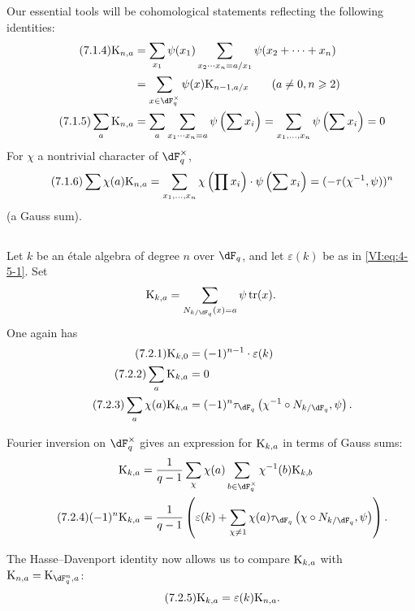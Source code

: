 \documentclass[12pt,oneside,english]{smfbook}
\DeclareMathOperator{\tr}{tr}
\newcounter{char}
\newcommand{\kloos}{\textnormal{K}} %
\begin{document}
Our essential tools will be cohomological statements reflecting the following identities:
\begin{align*}\tag{7.1.4}\label{VI:eq:7-1-4}
  \kloos_{n,a} &= \sum_{x_1} \psi(x_1) \sum_{x_2\dotsm x_n = a/x_1} \psi(x_2+\cdots + x_n) \\ \notag
    &= \sum_{x\in \dF_q^\times} \psi(x) \kloos_{n-1,a/x} \qquad (a\ne 0,n\geqslant 2) \\ \tag{7.1.5}\label{VI:eq:7-1-5}
  \sum_a \kloos_{n,a} &= \sum_a \sum_{x_1 \dotsm x_n = a} \psi\left(\sum x_i\right) = \sum_{x_1,\dots,x_n} \psi\left(\sum x_i\right) = 0
\end{align*}
For $\chi$ a nontrivial character of $\dF_q^\times$,
\begin{equation*}\tag{7.1.6}\label{VI:eq:7-1-6}
  \sum \chi(a) \kloos_{n,a} = \sum_{x_1,\dots,x_n} \chi\left(\prod x_i\right) \cdot \psi\left(\sum x_i\right) = (-\tau(\chi^{-1},\psi))^n
\end{equation*}
(a Gauss sum).

\subsection{}\label{VI:7-2}

Let $k$ be an étale algebra of degree $n$ over $\dF_q$, and let $\varepsilon(k)$ be as in \eqref{VI:eq:4-5-1}. Set
\[
  \kloos_{k,a} = \sum_{N_{k/\dF_q}(x)=a} \psi \tr(x) \text{.}
\]
One again has
\begin{align*}\tag{7.2.1}\label{VI:eq:7-2-1}
  \kloos_{k,0} &= (-1)^{n-1} \cdot \varepsilon(k) \\ \tag{7.2.2}\label{VI:eq:7-2-2}
  \sum_a \kloos_{k,a} &= 0 \\ \tag{7.2.3}\label{VI:eq:7-2-3}
  \sum_a \chi(a) \kloos_{k,a} &= (-1)^n \tau_{\dF_q}\left(\chi^{-1}\circ N_{k/\dF_q},\psi\right) \text{.}
\end{align*}

Fourier inversion on $\dF_q^\times$ gives an expression for $\kloos_{k,a}$ in terms of Gauss sums:
\begin{align*}
  \kloos_{k,a} &= \frac{1}{q-1} \sum_\chi \chi(a) \sum_{b\in \dF_q^\times} \chi^{-1}(b) \kloos_{k,b} \\ \tag{7.2.4}\label{VI:eq:7-2-4}
  (-1)^n \kloos_{k,a} &= \frac{1}{q-1} \left(\varepsilon(k) + \sum_{\chi\ne 1} \chi(a) \tau_{\dF_q}\left(\chi\circ N_{k/\dF_q},\psi\right) \right) \text{.}
\end{align*}

The Hasse--Davenport identity now allows us to compare $\kloos_{k,a}$ with $\kloos_{n,a}=\kloos_{\dF_q^n,a}$:
\begin{equation*}\tag{7.2.5}\label{VI:eq:7-2-5}
  \kloos_{k,a} = \varepsilon(k) \kloos_{n,a} \text{.}
\end{equation*}
\end{document}

